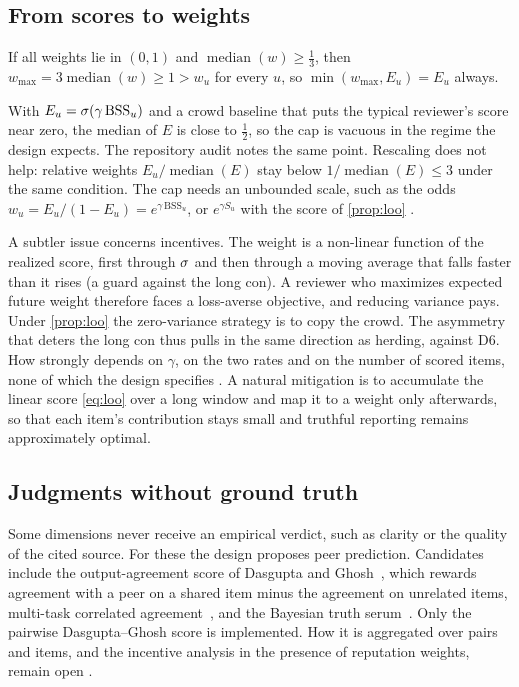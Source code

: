 \subsection{From scores to weights}

\begin{proposition}\label{prop:cap}\proved{}
If all weights lie in $(0,1)$ and $\operatorname{median}(w)\ge\tfrac13$, then
$w_{\max}=3\operatorname{median}(w)\ge1>w_u$ for every $u$, so $\min(w_{\max},E_u)=E_u$ always.
\end{proposition}

With $E_u=\sigma(\gamma\,\mathrm{BSS}_u)$ and a crowd baseline that puts the typical reviewer's
score near zero, the median of $E$ is close to $\tfrac12$, so the cap is vacuous in the regime the
design expects. The repository audit notes the same point. Rescaling does not help:
relative weights $E_u/\operatorname{median}(E)$ stay below $1/\operatorname{median}(E)\le3$ under
the same condition. The cap needs an unbounded scale, such as the odds
$w_u=E_u/(1-E_u)=e^{\gamma\,\mathrm{BSS}_u}$, or $e^{\gamma S_u}$ with the score of
\cref{prop:loo} \openq.

A subtler issue concerns incentives. The weight is a non-linear function of the realized score,
first through $\sigma$ and then through a moving average that falls faster than it rises (a guard
against the long con). A reviewer who maximizes expected future weight therefore faces a
loss-averse objective, and reducing variance pays. Under \cref{prop:loo} the zero-variance
strategy is to copy the crowd. The asymmetry that deters the long con thus pulls in the same
direction as herding, against D6. How strongly depends on $\gamma$, on the two rates and on the
number of scored items, none of which the design specifies \openq. A natural mitigation is to
accumulate the linear score \eqref{eq:loo} over a long window and map it to a weight only
afterwards, so that each item's contribution stays small and truthful reporting remains
approximately optimal.

\subsection{Judgments without ground truth}

Some dimensions never receive an empirical verdict, such as clarity or the quality of the cited
source. For these the design proposes peer prediction. Candidates include the output-agreement
score of Dasgupta and Ghosh~\cite{dasgupta2013crowdsourced}, which rewards agreement with a peer
on a shared item minus the agreement on unrelated items, multi-task correlated
agreement~\cite{shnayder2016informed}, and the Bayesian truth serum~\cite{prelec2004bts}. Only the
pairwise Dasgupta--Ghosh score is implemented. How it is aggregated over pairs and items, and the
incentive analysis in the presence of reputation weights, remain open \openq.
